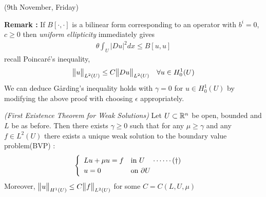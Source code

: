 \documentclass[10pt,a4paper]{report}
\begin{document}
\newday

(9th November, Friday)
\s

\textbf{Remark :} If $B[\cdot,\cdot]$ is a bilinear form corresponding to an operator with $b^i=0$, $c\geq 0$ then \emph{uniform ellipticity} immediately gives
\begin{align*}
\theta \int_U |Du|^2 dx \leq B[u,u]
\end{align*}
recall Poincar\'{e}'s inequality,
\begin{align*}
\bigl\lVert u\bigr\rVert_{L^2(U)} \leq C \bigl\lVert Du\bigr\rVert_{L^2(U)} \quad \forall u\in H_0^1 (U)
\end{align*}
We can deduce G{\aa}rding's inequality holds with $\gamma =0$ for $u\in H_0^1 (U)$ by modifying the above proof with choosing $\epsilon$ appropriately.
\s

\thm \emph{(First Existence Theorem for Weak Solutions)} Let $U\subset \mathbb{R}^n$ be open, bounded and $L$ be as before. Then there exists $\gamma \geq 0$ such that for any $\mu \geq \gamma$ and any $f\in L^2(U)$ there exists a unique weak solution to the boundary value problem(BVP) :
\begin{align*}
\begin{cases}
\begin{array}{ll}
Lu + \mu u =f & \text{in } U  \quad \cdots\cdots (\dagger) \\
u = 0 & \text{on } \partial U
\end{array}
\end{cases}
\end{align*}
Moreover, $\bigl\lVert u\bigr\rVert_{H^1(U)} \leq C \bigl\lVert f\bigr\rVert_{L^2(U)}$ for some $C = C(L,U,\mu)$
\s
\end{document}
